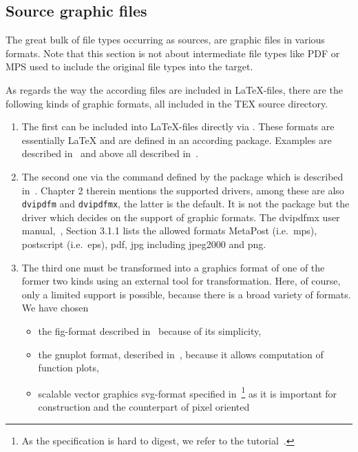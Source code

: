 \subsection{Source graphic files}\label{subsec:sourcesGraphic}

The great bulk of file types occurring as sources, 
are graphic files in various formats. 
Note that this section is not about intermediate file types like PDF or MPS 
used to include the original file types into the target. 

As regards the way the according files are included in \LaTeX-files, 
there are the following kinds of graphic formats, 
all included in the TEX source directory. 
%
\begin{enumerate}
\item
The first can be included into \LaTeX-files directly via . 
These formats are essentially \LaTeX{}
and are defined in an according package. 
Examples are  described in~\cite{EEpic}
and above all  described in~\cite{TikzPGF23}. 
\item
The second one via the command  
defined by the package  
which is described in~\cite{GraX}. 
Chapter 2 therein mentions the supported drivers, 
among these are also \texttt{dvipdfm} and \texttt{dvipdfmx}, the latter is the default. 
It is not the package but the driver 
which decides on the support of graphic formats. 
The dvipdfmx user manual,~\cite{DviPdfMx}, Section 3.1.1 lists the allowed formats 
MetaPost (i.e.~\gls{mps}), postscript (i.e.~\gls{eps}), 
\gls{pdf}, \gls{jpg} including jpeg2000 and \gls{png}. 
\item\label{it:transExp}
The third one must be transformed into a graphics format 
of one of the former two kinds using an external tool for transformation. 
Here, of course, only a limited support is possible, 
because there is a broad variety of formats. 
We have chosen
%
\begin{itemize}
\item
  the \gls{fig}-format described in~\cite{XFigF}
  because of its simplicity, 
\item
  the gnuplot format, described in~\cite{GnuPlot6_0}, 
  because it allows computation of function plots, 
\item
  scalable vector graphics \gls{svg}-format specified in~\cite{Svg11}\footnote%
  { As the specification is hard to digest,
  we refer to the tutorial~\cite{SvgTut}. } 
  as it is important for construction and the counterpart of pixel oriented

\end{itemize}
\end{enumerate}
